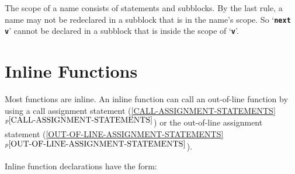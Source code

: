 \documentclass[12pt]{article}
\newcommand{\TT}[1]{{\tt \bfseries #1}}
\newcommand{\itemref}[1]{\ref{#1}$^{p\pageref{#1}}$}
\begin{document}
The scope of a name consists of statements and subblocks.
By the last rule, a name may not be
redeclared in a subblock that is in the name's scope.
So `\TT{next v}' cannot be declared in a subblock that is inside the scope
of `\TT{v}'.

\section{Inline Functions}
\label{INLINE-FUNCTIONS}

Most functions are inline.  An inline function can call an out-of-line
function by using
a call assignment statement (\itemref{CALL-ASSIGNMENT-STATEMENTS})
or the out-of-line assignment statement
(\itemref{OUT-OF-LINE-ASSIGNMENT-STATEMENTS}).

Inline function declarations have the form:
\end{document}
